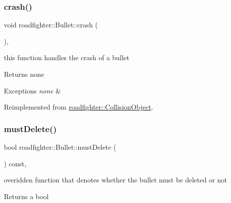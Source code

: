 \mbox{\label{classroadfighter_1_1Bullet_ac96121377fffa9ed8ea94c333a841a7a}} 
\subsubsection{\texorpdfstring{crash()}{crash()}}
{\footnotesize\ttfamily void roadfighter\+::\+Bullet\+::crash (\begin{DoxyParamCaption}{ }\end{DoxyParamCaption})\hspace{0.3cm}{\ttfamily [override]}, {\ttfamily [virtual]}}

this function handles the crash of a bullet \begin{DoxyReturn}{Returns}
none 
\end{DoxyReturn}

\begin{DoxyExceptions}{Exceptions}
{\em none} & \\
\hline
\end{DoxyExceptions}


Reimplemented from \hyperlink{classroadfighter_1_1CollisionObject_a9a5265d810f0ed7583b60046ab3fa88c}{roadfighter\+::\+Collision\+Object}.

\mbox{\label{classroadfighter_1_1Bullet_a0f87b693a1583522e551ba1324fcd067}} 
\subsubsection{\texorpdfstring{must\+Delete()}{mustDelete()}}
{\footnotesize\ttfamily bool roadfighter\+::\+Bullet\+::must\+Delete (\begin{DoxyParamCaption}{ }\end{DoxyParamCaption}) const\hspace{0.3cm}{\ttfamily [override]}, {\ttfamily [virtual]}}

overidden function that denotes whether the bullet must be deleted or not \begin{DoxyReturn}{Returns}
a bool 
\end{DoxyReturn}

